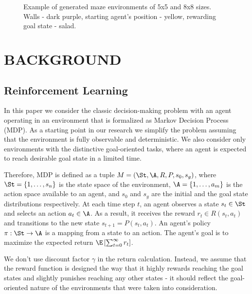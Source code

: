 \documentclass[a4paper,twoside]{article}
\begin{document}
\begin{figure}
  \centering
  \begin{minipage}{.49\linewidth}
    
  \end{minipage}
  \begin{minipage}{.49\linewidth}
    
  \end{minipage}
  \caption{Example of generated maze environments of 5x5 and 8x8 sizes. Walls - dark purple, starting agent's position - yellow, rewarding goal state - salad.} \label{fig_maze_examples}
\end{figure}

\section{\uppercase{Background}}

\subsection{Reinforcement Learning}

In this paper we consider the classic decision-making problem with an agent operating in an environment that is formalized as Markov Decision Process (MDP). As a starting point in our research we simplify the problem assuming that the environment is fully observable and deterministic. We also consider only environments with the distinctive goal-oriented tasks, where an agent is expected to reach desirable goal state in a limited time.

Therefore, MDP is defined as a tuple $M = (\St, \A, R, P, s_0, s_g)$, where $\St = \{1, \dots, s_n\}$ is the state space of the environment, $\A = \{1, \dots, a_m\}$ is the action space available to an agent, and $s_0$ and $s_g$ are the initial and the goal state distributions respectively. At each time step $t$, an agent observes a state $s_t \in \St$ and selects an action $a_t \in \A$. As a result, it receives the reward $r_t \in R(s_t, a_t)$ and transitions to the new state $s_{t+1} = P(s_t, a_t)$. An agent's policy $\pi: \St \rightarrow \A$ is a mapping from a state to an action. The agent's goal is to maximize the expected return $\E \left[ \sum_{t=0}^{\infty} r_t \right]$. 

We don't use discount factor $\gamma$ in the return calculation. Instead, we assume that the reward function is designed the way that it highly rewards reaching the goal states and slightly punishes reaching any other states - it should reflect the goal-oriented nature of the environments that were taken into consideration.
\end{document}
